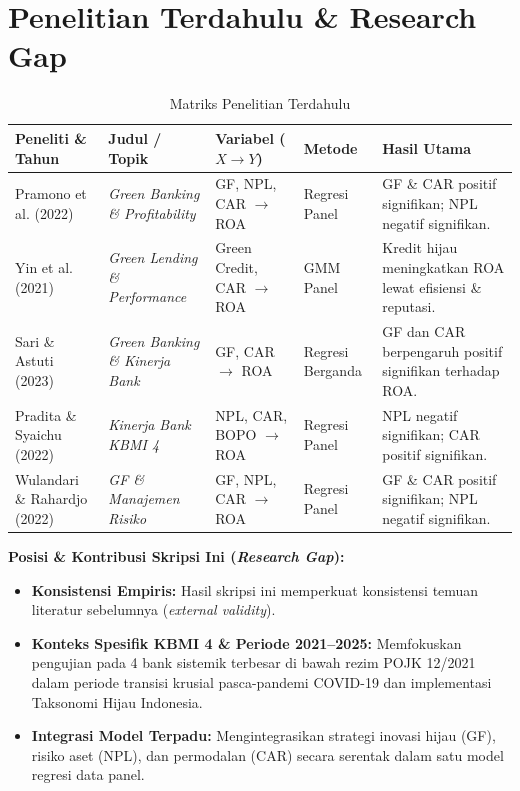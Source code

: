 \documentclass[11pt,a4paper]{article}
\begin{document}
\section{Penelitian Terdahulu \& Research Gap}

\begin{table}[htbp]
\centering
\small
\renewcommand{\arraystretch}{1.25}
\caption{Matriks Penelitian Terdahulu}
\begin{tabularx}{\textwidth}{p{3.2cm} p{2.8cm} p{2.8cm} p{2cm} X}
\toprule
\rowcolor{tableHeaderBg}
\textbf{Peneliti \& Tahun} & \textbf{Judul / Topik} & \textbf{Variabel ($X \rightarrow Y$)} & \textbf{Metode} & \textbf{Hasil Utama} \\
\midrule
Pramono et al. (2022) & \textit{Green Banking \& Profitability} & GF, NPL, CAR $\rightarrow$ ROA & Regresi Panel & GF \& CAR positif signifikan; NPL negatif signifikan. \\
\midrule
Yin et al. (2021) & \textit{Green Lending \& Performance} & Green Credit, CAR $\rightarrow$ ROA & GMM Panel & Kredit hijau meningkatkan ROA lewat efisiensi \& reputasi. \\
\midrule
Sari \& Astuti (2023) & \textit{Green Banking \& Kinerja Bank} & GF, CAR $\rightarrow$ ROA & Regresi Berganda & GF dan CAR berpengaruh positif signifikan terhadap ROA. \\
\midrule
Pradita \& Syaichu (2022) & \textit{Kinerja Bank KBMI 4} & NPL, CAR, BOPO $\rightarrow$ ROA & Regresi Panel & NPL negatif signifikan; CAR positif signifikan. \\
\midrule
Wulandari \& Rahardjo (2022) & \textit{GF \& Manajemen Risiko} & GF, NPL, CAR $\rightarrow$ ROA & Regresi Panel & GF \& CAR positif signifikan; NPL negatif signifikan. \\
\bottomrule
\end{tabularx}
\end{table}

\textbf{Posisi \& Kontribusi Skripsi Ini (\textit{Research Gap}):}
\begin{itemize}
    \item \textbf{Konsistensi Empiris:} Hasil skripsi ini memperkuat konsistensi temuan literatur sebelumnya (\textit{external validity}).
    \item \textbf{Konteks Spesifik KBMI 4 \& Periode 2021--2025:} Memfokuskan pengujian pada 4 bank sistemik terbesar di bawah rezim POJK 12/2021 dalam periode transisi krusial pasca-pandemi COVID-19 dan implementasi Taksonomi Hijau Indonesia.
    \item \textbf{Integrasi Model Terpadu:} Mengintegrasikan strategi inovasi hijau (GF), risiko aset (NPL), dan permodalan (CAR) secara serentak dalam satu model regresi data panel.
\end{itemize}
\end{document}
